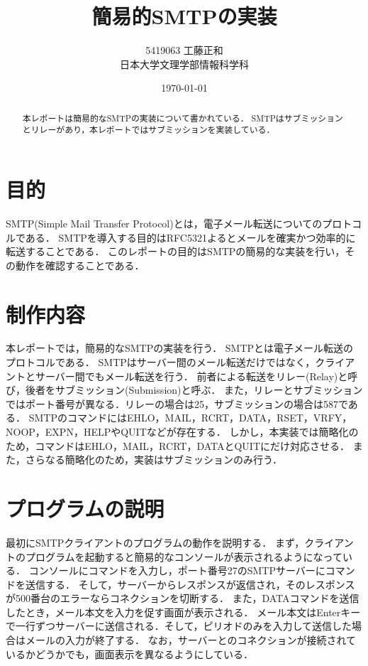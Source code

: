 \documentclass[dvipdfmx,a4paper]{jsarticle}
\title{簡易的SMTPの実装}
\author{5419063 工藤正和\\日本大学文理学部情報科学科}
\date{\today}
\theoremstyle{definition}
\begin{document}
\maketitle

\begin{abstract}
  本レポートは簡易的なSMTPの実装について書かれている．
  SMTPはサブミッションとリレーがあり，本レポートではサブミッションを実装している．
\end{abstract}

\section{目的}
SMTP(Simple Mail Transfer Protocol)とは，電子メール転送についてのプロトコルである．
SMTPを導入する目的はRFC5321よるとメールを確実かつ効率的に転送することである．
このレポートの目的はSMTPの簡易的な実装を行い，その動作を確認することである．


\section{制作内容}
  本レポートでは，簡易的なSMTPの実装を行う．
  SMTPとは電子メール転送のプロトコルである．
  SMTPはサーバー間のメール転送だけではなく，クライアントとサーバー間でもメール転送を行う．
  前者による転送をリレー(Relay)と呼び，後者をサブミッション(Submission)と呼ぶ．
  また，リレーとサブミッションではポート番号が異なる．リレーの場合は25，サブミッションの場合は587である．
  SMTPのコマンドにはEHLO，MAIL，RCRT，DATA，RSET，VRFY，NOOP，EXPN，HELPやQUITなどが存在する．
  しかし，本実装では簡略化のため，コマンドはEHLO，MAIL，RCRT，DATAとQUITにだけ対応させる．
  また，さらなる簡略化のため，実装はサブミッションのみ行う．
\section{プログラムの説明}

最初にSMTPクライアントのプログラムの動作を説明する．
まず，クライアントのプログラムを起動すると簡易的なコンソールが表示されるようになっている．
コンソールにコマンドを入力し，ポート番号27のSMTPサーバーにコマンドを送信する．
そして，サーバーからレスポンスが返信され，そのレスポンスが500番台のエラーならコネクションを切断する．
また，DATAコマンドを送信したとき，メール本文を入力を促す画面が表示される．
メール本文はEnterキーで一行ずつサーバーに送信される．そして，ピリオドのみを入力して送信した場合はメールの入力が終了する．
なお，サーバーとのコネクションが接続されているかどうかでも，画面表示を異なるようにしている．
\end{document}
